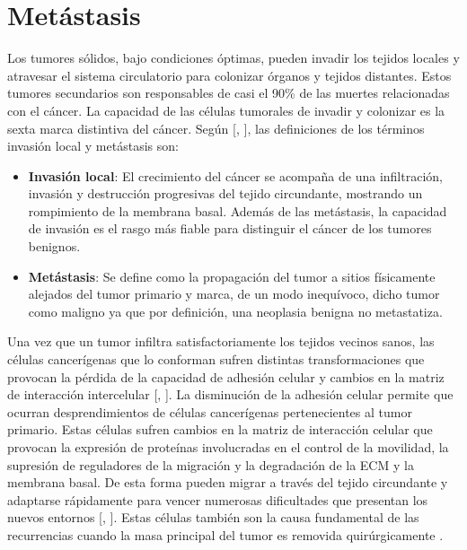 \section{Metástasis}
\label{subsec-meta}
\hspace{.1cm}Los tumores sólidos, bajo condiciones óptimas, pueden invadir los tejidos locales y atravesar el sistema circulatorio para colonizar órganos y tejidos distantes. Estos tumores secundarios son responsables de casi el 90\% de las muertes relacionadas con el cáncer. La capacidad de las células tumorales de invadir y colonizar es la sexta marca distintiva del cáncer. Según [\cite{robins}, \cite{hanahan}], las definiciones de los términos invasión local y metástasis son:
\begin{itemize}
    \item \textbf{Invasión local}: El crecimiento del cáncer se acompaña de una infiltración, invasión y destrucción progresivas del tejido circundante, mostrando un rompimiento de la membrana basal. Además de las metástasis, la capacidad de invasión es el rasgo más fiable para distinguir el cáncer de los tumores benignos.
    \item \textbf{Metástasis}: Se define como la propagación del tumor a sitios físicamente alejados del tumor primario y marca, de un modo inequívoco, dicho tumor como maligno ya que por definición, una neoplasia benigna no metastatiza.
\end{itemize}

\hspace{.1cm}Una vez que un tumor infiltra satisfactoriamente los tejidos vecinos sanos, las células cancerígenas que lo conforman sufren distintas transformaciones que provocan la pérdida de la capacidad de adhesión celular y cambios en la matriz de interacción intercelular [\cite{hanahan}, \cite{cancerbook}]. La disminución de la adhesión celular permite que ocurran desprendimientos de células cancerígenas pertenecientes al tumor primario. Estas células sufren cambios en la matriz de interacción celular que provocan la expresión de proteínas involucradas en el control de la movilidad, la supresión de reguladores de la migración y la degradación de la ECM y la membrana basal. De esta forma pueden migrar a través del tejido circundante y adaptarse rápidamente para vencer numerosas dificultades que presentan los nuevos entornos [\cite{hanahan}, \cite{cancerbook}]. Estas células también son la causa fundamental de las recurrencias cuando la masa principal del tumor es removida quirúrgicamente \cite{kansal3}.

